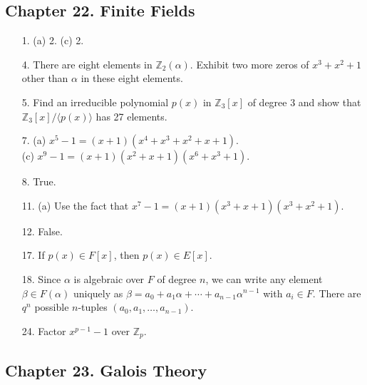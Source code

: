 \subsection*{Chapter 22. Finite Fields}
 
{\small
\begin{itemize}

\item[1.]
(a) 2.
(c) 2.
 
\item[4.] 
There are eight elements in ${\mathbb Z}_2(\alpha)$. Exhibit two more
zeros of $x^3 + x^2 + 1$ other than $\alpha$ in these eight elements. 
 
\item[5.] 
Find an irreducible polynomial $p(x)$ in ${\mathbb Z}_3[x]$ of degree
3 and show that ${\mathbb Z}_3[x]/ \langle p(x) \rangle$ has 27
elements. 

\item[7.]
(a) $x^5 -1 = (x+1)(x^4+x^3 + x^2 + x+ 1)$. \\
(c) $x^9 -1 = (x+1)( x^2 + x+ 1)(x^6+x^3+1)$.
 
\item[8.]
True.

\item[11.]
(a) Use the fact that $x^7 -1 = (x+1)( x^3 + x+ 1)(x^3+x^2+1)$.

\item[12.]
False.

\item[17.]
If $p(x) \in F[x]$, then $p(x) \in E[x]$.


\item[18.]
Since $\alpha$ is algebraic over $F$ of degree $n$, we can write any
element $\beta \in F(\alpha)$ uniquely as $\beta = a_0  + a_1 \alpha +
\cdots + a_{n-1} \alpha^{n-1}$ with $a_i \in F$. There are $q^n$
possible $n$-tuples $(a_0, a_1, \ldots, a_{n-1})$.


\item[24.]
Factor $x^{p-1} - 1$ over ${\mathbb Z}_p$.


\end{itemize}
}
 
\subsection*{Chapter 23. Galois Theory}
 
